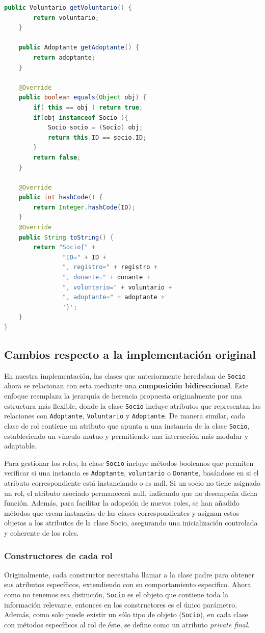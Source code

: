 \begin{lstlisting}[style = javaNormal, language=Java]
    public Voluntario getVoluntario() {
        return voluntario;
    }

    public Adoptante getAdoptante() {
        return adoptante;
    }

    @Override
    public boolean equals(Object obj) {
        if( this == obj ) return true;
        if(obj instanceof Socio ){
            Socio socio = (Socio) obj;
            return this.ID == socio.ID;
        }
        return false;
    }

    @Override
    public int hashCode() {
        return Integer.hashCode(ID);
    }
    @Override
    public String toString() {
        return "Socio{" +
                "ID=" + ID +
                ", registro=" + registro +
                ", donante=" + donante +
                ", voluntario=" + voluntario +
                ", adoptante=" + adoptante +
                '}';
    }
}

\end{lstlisting}

\subsection{Cambios respecto a la implementación original}
En nuestra implementación, las clases que anteriormente heredaban de \texttt{Socio} ahora se relacionan con esta mediante 
una \textbf{composición bidireccional}. Este enfoque reemplaza la jerarquía de herencia propuesta originalmente por una 
estructura más flexible, donde la clase \texttt{Socio} incluye atributos que representan las relaciones con \texttt{Adoptante}, 
\texttt{Voluntario} y \texttt{Adoptante}. De manera similar, cada clase de rol contiene un atributo que apunta a una instancia 
de la clase \texttt{Socio}, estableciendo un vínculo mutuo y permitiendo una interacción más modular y adaptable.

Para gestionar los roles, la clase \texttt{Socio} incluye métodos booleanos que permiten verificar si una instancia es 
\texttt{Adoptante}, \texttt{voluntario} o \texttt{Donante}, basándose en si el atributo correspondiente está instanciando 
o es null. Si un socio no tiene asignado un rol, el atributo asociado permanecerá null, indicando que no desempeña dicha 
función. Además, para facilitar la adopción de nuevos roles, se han añadido métodos que crean instancias de las clases 
correspondientes y asignan estos objetos a los atributos de la clase Socio, asegurando una inicialización controlada y 
coherente de los roles.

\subsubsection{Constructores de cada rol}
Originalmente, cada constructor necesitaba llamar a la clase padre para obtener sus atributos específicos, extendiendo con su comportamiento especifico.
Ahora como no tenemos esa distinción, \texttt{Socio} es el objeto que contiene toda la información relevante, entonces en los constructores es el único parámetro.
Además, como solo puede existir un sólo tipo de objeto (\texttt{Socio}), en cada clase con métodos específicos al rol de éste, se define como un atributo \emph{private final}.

